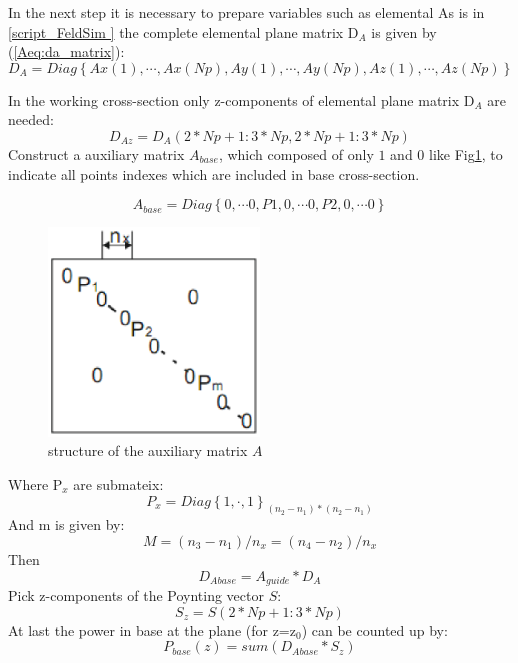 In the next step it is necessary to prepare variables such as elemental 
As is in \ref{script_FeldSim } the complete elemental plane matrix D$_{A}$ is given by (\ref{Aeq:da_matrix}): 
\begin{equation}
D_{A}=Diag\left\{Ax(1),\cdots,Ax(Np),Ay(1),\cdots,Ay(Np), Az(1),\cdots,Az(Np)\right\}
\label{Aeq:da_matrix}
\end{equation}

In the working cross-section only z-components of elemental plane matrix D$_{A}$ are needed:
\begin{equation}
D_{Az}=D_{A}(2*Np+1:3*Np, 2*Np+1:3*Np)
\label{Aeq:daz_matrix}
\end{equation}
Construct a auxiliary matrix $A_{base}$, which composed of only $1$ and $0$ like Fig\quad\ref{Afig:app_Auxiliary_matrix}, to indicate all points indexes which are included in base cross-section. 

\begin{equation}
A_{base}=Diag\left\{0,\cdots 0,P1,0,\cdots 0,P2,0,\cdots 0\right\}
\label{Aeq:A_matrix}
\end{equation}

\begin{figure}[ht]
\centering
\includegraphics[width=0.5\textwidth]{bilder/app_Auxiliary_matrix}
\caption{structure of the auxiliary matrix $A$}
\label{Afig:app_Auxiliary_matrix}
\end{figure}
Where P$_{x}$ are submateix:
\begin{equation}
P_{x}=Diag\left\{1,\cdot,1\right\}_{(n_{2}-n_{1})*(n_{2}-n_{1})}
\end{equation}
And m is given by:
\begin{equation}
M=(n_{3}-n_{1})/n_{x}=(n_{4}-n_{2})/n_{x}
\end{equation}
Then 
\begin{equation}
D_{Abase}=A_{guide}*D_{A}
\end{equation}
Pick z-components of the Poynting vector $S$:
\begin{equation}
S_{z}=S(2*Np+1:3*Np)
\end{equation}
At last the power in base at the plane (for z=z$_{0}$) can be counted up by:
\begin{equation}
P_{base}(z)=sum(D_{Abase}*S_{z})
\end{equation}

